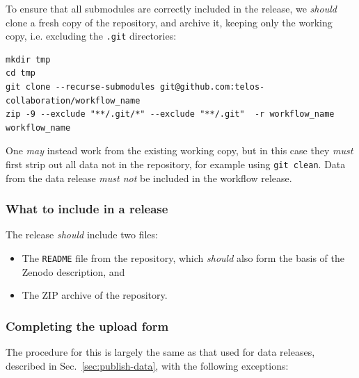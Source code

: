 \documentclass{article}
\newcommand\rfcword[1]{\emph{#1}\xspace}
\newcommand\must{\rfcword{must}}
\newcommand\mustnot{\rfcword{must not}}
\newcommand\should{\rfcword{should}}
\newcommand\may{\rfcword{may}}
\newcommand\filename[1]{\texttt{#1}\xspace}
\newcommand\readme{\filename{README}}
\begin{document}
To ensure that all submodules are correctly included in the release,
we \should clone a fresh copy of the repository,
and archive it,
keeping only the working copy,
i.e. excluding the \filename{.git} directories:

\begin{verbatim}
mkdir tmp
cd tmp
git clone --recurse-submodules git@github.com:telos-collaboration/workflow_name
zip -9 --exclude "**/.git/*" --exclude "**/.git"  -r workflow_name workflow_name
\end{verbatim}

One \may instead work from the existing working copy,
but in this case they \must first strip out all data not in the repository,
for example using \verb|git clean|.
Data from the data release \mustnot be included in the workflow release.

\subsubsection{What to include in a release}

The release \should include two files:

\begin{itemize}
  \item
        The \readme file from the repository,
        which \should also form the basis of the Zenodo description, and
  \item
        The ZIP archive of the repository.
\end{itemize}

\subsubsection{Completing the upload form}

The procedure for this is largely the same as that used for data releases,
described in Sec.~\ref{sec:publish-data},
with the following exceptions:
\end{document}

